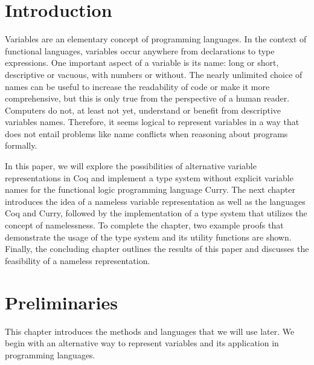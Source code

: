 \documentclass[a4paper, 11pt, fleqn]{scrreprt}
\begin{document}
\newpage               %

\chapter{Introduction}
Variables are an elementary concept of programming languages. In the context of functional languages, variables occur anywhere from declarations to type expressions. One important aspect of a variable is its name: long or short, descriptive or vacuous, with numbers or without. The nearly unlimited choice of names can be useful to increase the readability of code or make it more comprehensive, but this is only true from the perspective of a human reader. Computers do not, at least not yet, understand or benefit from descriptive variables names. Therefore, it seems logical to represent variables in a way that does not entail problems like name conflicts when reasoning about programs formally.
\par
In this paper, we will explore the possibilities of alternative variable representations in Coq and implement a type system without explicit variable names for the functional logic programming language Curry. The next chapter introduces the idea of a nameless variable representation as well as the languages Coq and Curry, followed by the implementation of a type system that utilizes the concept of namelessness. To complete the chapter, two example proofs that demonstrate the usage of the type system and its utility functions are shown. Finally, the concluding chapter outlines the results of this paper and discusses the feasibility of a nameless representation.

\chapter{Preliminaries}
\label{preliminiaries}
This chapter introduces the methods and languages that we will use later. We begin with an alternative way to represent variables and its application in programming languages.
\end{document}
